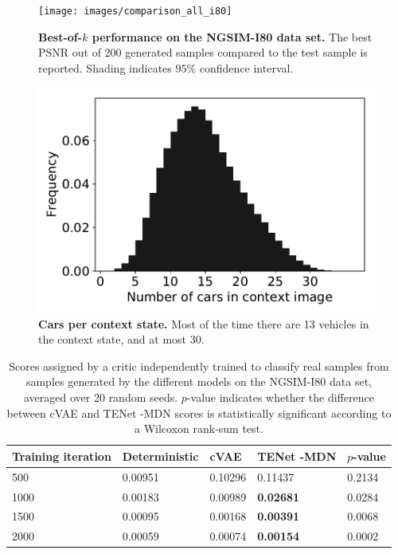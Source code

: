 \documentclass{article}
\newcommand{\modelname}{TENet }
\begin{document}
\begin{figure}[t!]
  \begin{minipage}[t]{0.49 \textwidth}
    \centering
    \texttt{[image: images/comparison\_all\_i80]}
    \caption{
      \textbf{Best-of-$k$ performance on the NGSIM-I80 data set.}
      The best PSNR out of 200 generated samples compared to the test sample is reported.
      Shading indicates $95\%$ confidence interval.
    }
    \label{best-of-k-i80}
  \end{minipage} \quad%
  \begin{minipage}[t]{0.49 \textwidth}
    \centering
    \includegraphics[width=\textwidth]{images/car_statistics}
    \caption{
      \textbf{Cars per context state.}
      Most of the time there are 13 vehicles in the context state, and at most 30.
    }
    \label{car-statistics}
  \end{minipage}
\end{figure}

\begin{table}[t!]
  \caption{
    Scores assigned by a critic independently trained to classify real samples from samples generated by the different models on the NGSIM-I80 data set, averaged over 20 random seeds.
    $p$-value indicates whether the difference between cVAE and \modelname-MDN scores is statistically significant according to a Wilcoxon rank-sum test.
  }
  \label{critic-table}
  \centering
  \begin{tabular}{l|l|lll}
    \toprule
    Training iteration     & Deterministic & cVAE & \modelname-MDN & $p$-value \\
    \midrule
    500 & 0.00951 & 0.10296 & 0.11437 & 0.2134 \\
    1000 & 0.00183 & 0.00989 & \textbf{0.02681} & 0.0284 \\
    1500 & 0.00095 & 0.00168 & \textbf{0.00391} & 0.0068 \\
    2000 & 0.00059 & 0.00074 & \textbf{0.00154} & 0.0002 \\
    \bottomrule
  \end{tabular}
\end{table}
\end{document}
